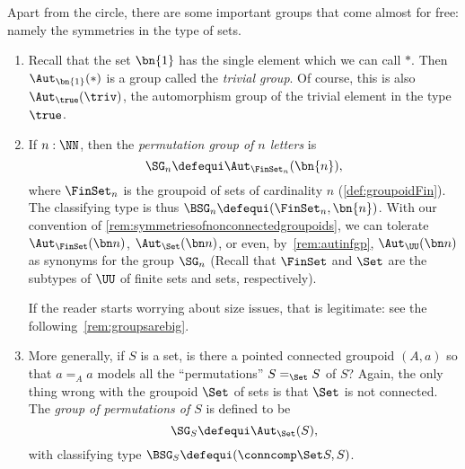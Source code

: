 \begin{example}\label{ex:groups}
  Apart from the circle, there are some important groups that come almost for free:
  namely the symmetries in the type of sets.
  \begin{enumerate}
  \item Recall that the set $\bn{1}$ has the single element
    which we can call $*$. Then
    $\Aut_{\bn{1}}(*)$ is a group called the \emph{trivial group}.
    Of course, this is also $\Aut_{\true}(\triv)$,
    the automorphism group of the trivial element in the type $\true$.
  \item If $n:\NN$, then the \emph{permutation group of $n$ letters} is
    \[
      \SG_n\defequi\Aut_{\FinSet_n}(\bn{n}),
    \]
    where $\FinSet_n$ is the groupoid of sets of cardinality $n$
    (\cf \ref{def:groupoidFin}).
    The classifying type is thus $\BSG_n\defequi (\FinSet_n,\bn{n})$.
    With our convention of \cref{rem:symmetriesofnonconnectedgroupoids},
    we can tolerate $\Aut_{\FinSet}(\bn n)$, $\Aut_{\Set}(\bn n)$,
    or even, by~\cref{rem:autinfgp}, $\Aut_{\UU}(\bn n)$
    as synonyms for the group $\SG_n$
    (Recall that $\FinSet$ and $\Set$ are the subtypes of $\UU$
    of finite sets and sets, respectively).

    If the reader starts worrying about size issues, that is legitimate:
    see the following~\cref{rem:groupsarebig}.
  \item More generally, if $S$ is a set, is there a pointed connected groupoid $(A,a)$ so that $a=_Aa$ models all the ``permutations'' $S=_{\Set}S$ of $S$?
    Again, the only thing wrong with the groupoid $\Set$ of sets
    is that $\Set$ is not connected.
    The \emph{group of permutations of $S$} is defined to be
    \[
      \SG_S\defequi\Aut_{\Set}(S),
    \]
    with classifying type $\BSG_S\defequi(\conncomp \Set S,S)$.\qedhere
  \end{enumerate}
\end{example}

